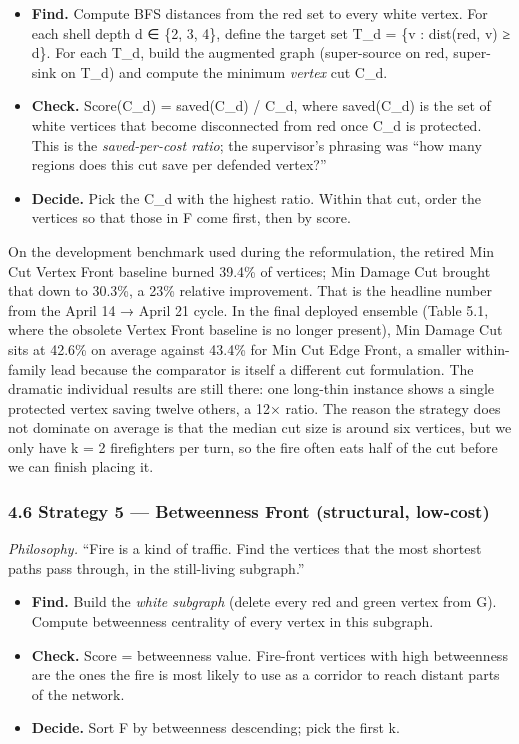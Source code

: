 \documentclass[
  11pt,
]{article}
\providecommand{\tightlist}{%
  \setlength{\itemsep}{0pt}\setlength{\parskip}{0pt}}
\begin{document}
\begin{itemize}
\tightlist
\item
  \textbf{Find.} Compute BFS distances from the red set to every white
  vertex. For each shell depth d ∈ \{2, 3, 4\}, define the target set
  T\_d = \{v : dist(red, v) ≥ d\}. For each T\_d, build the augmented
  graph (super-source on red, super-sink on T\_d) and compute the
  minimum \emph{vertex} cut C\_d.
\item
  \textbf{Check.} Score(C\_d) = \textbar saved(C\_d)\textbar{} /
  \textbar C\_d\textbar, where saved(C\_d) is the set of white vertices
  that become disconnected from red once C\_d is protected. This is the
  \emph{saved-per-cost ratio}; the supervisor's phrasing was ``how many
  regions does this cut save per defended vertex?''
\item
  \textbf{Decide.} Pick the C\_d with the highest ratio. Within that
  cut, order the vertices so that those in F come first, then by score.
\end{itemize}

On the development benchmark used during the reformulation, the retired
Min Cut Vertex Front baseline burned 39.4\% of vertices; Min Damage Cut
brought that down to 30.3\%, a 23\% relative improvement. That is the
headline number from the April 14 → April 21 cycle. In the final
deployed ensemble (Table 5.1, where the obsolete Vertex Front baseline
is no longer present), Min Damage Cut sits at 42.6\% on average against
43.4\% for Min Cut Edge Front, a smaller within-family lead because the
comparator is itself a different cut formulation. The dramatic
individual results are still there: one long-thin instance shows a
single protected vertex saving twelve others, a 12× ratio. The reason
the strategy does not dominate on average is that the median cut size is
around six vertices, but we only have k = 2 firefighters per turn, so
the fire often eats half of the cut before we can finish placing it.

\subsubsection{4.6 Strategy 5 --- Betweenness Front (structural,
low-cost)}\label{strategy-5-betweenness-front-structural-low-cost}

\emph{Philosophy.} ``Fire is a kind of traffic. Find the vertices that
the most shortest paths pass through, in the still-living subgraph.''

\begin{itemize}
\tightlist
\item
  \textbf{Find.} Build the \emph{white subgraph} (delete every red and
  green vertex from G). Compute betweenness centrality of every vertex
  in this subgraph.
\item
  \textbf{Check.} Score = betweenness value. Fire-front vertices with
  high betweenness are the ones the fire is most likely to use as a
  corridor to reach distant parts of the network.
\item
  \textbf{Decide.} Sort F by betweenness descending; pick the first k.
\end{itemize}
\end{document}
